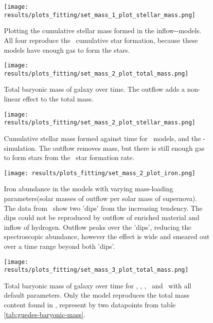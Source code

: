 \begin{figure}[h]
  \centering
  \texttt{[image: results/plots\_fitting/set\_mass\_1\_plot\_stellar\_mass.png]}
  \caption[]{\label{fig:fit-v1-1-stellar}
    Plotting the cumulative stellar mass formed in the inflow-\omegamodel-models. All four reproduce the \eris\ cumulative star formation, because these models have enough gas to form the stars.
  }
\end{figure}
\begin{figure}[h]
  \centering
  \texttt{[image: results/plots\_fitting/set\_mass\_2\_plot\_total\_mass.png]}
  \caption[]{\label{fig:fit-v1-2-total}
    Total baryonic mass of galaxy over time.
    The outflow adds a non-linear effect to the total mass.
  }
\end{figure}
\begin{figure}[h]
  \centering
  \texttt{[image: results/plots\_fitting/set\_mass\_2\_plot\_stellar\_mass.png]}
  \caption[]{\label{fig:fit-v1-2-stellar}
    Cumulative stellar mass formed against time for  \omegamodel\ models, and the \eris-simulation.
    The outflow removes mass, but there is still enough gas to form stars from the \eris\ star formation rate.
  }
\end{figure}
\begin{figure}[h]
  \centering
  \texttt{[image: results/plots\_fitting/set\_mass\_2\_plot\_iron.png]}
  \caption[]{\label{fig:fit-v1-2-iron}
    Iron abundance in the models with varying mass-loading parameters(solar masses of outflow per solar mass of supernova). The data from \eris\ show two 'dips' from the increasing tendency.
    The dips could not be reproduced by outflow of enriched material and inflow of hydrogen. Outflow peaks over the 'dips', reducing the spectroscopic abundance, however the effect is wide and smeared out over a time range beyond both 'dips'.
  }
\end{figure}
\begin{figure}[h]
  \centering
  \texttt{[image: results/plots\_fitting/set\_mass\_3\_plot\_total\_mass.png]}
  \caption[]{\label{fig:fit-v1-3-total}
    Total baryonic mass of galaxy over time for \eris, \fiduccialomega, \mwomega, \mwcomega\ and \omegamodel\ with all default parameters.
    Only the \fiduccialomega model reproduces the total mass content found in \eris, represent by two datapoints from table \ref{tab:guedes-baryonic-mass}.
  }
\end{figure}
